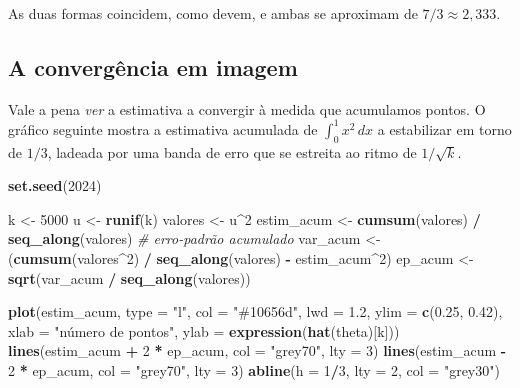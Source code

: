 \documentclass[
  portuguese,
  11pt,
  openany]{book}
\newenvironment{Shaded}{\begin{snugshade}}{\end{snugshade}}
\newcommand{\AttributeTok}[1]{\textcolor[rgb]{0.13,0.29,0.53}{#1}}
\newcommand{\CommentTok}[1]{\textcolor[rgb]{0.56,0.35,0.01}{\textit{#1}}}
\newcommand{\DecValTok}[1]{\textcolor[rgb]{0.00,0.00,0.81}{#1}}
\newcommand{\FloatTok}[1]{\textcolor[rgb]{0.00,0.00,0.81}{#1}}
\newcommand{\FunctionTok}[1]{\textcolor[rgb]{0.13,0.29,0.53}{\textbf{#1}}}
\newcommand{\NormalTok}[1]{#1}
\newcommand{\OtherTok}[1]{\textcolor[rgb]{0.56,0.35,0.01}{#1}}
\newcommand{\SpecialCharTok}[1]{\textcolor[rgb]{0.81,0.36,0.00}{\textbf{#1}}}
\newcommand{\StringTok}[1]{\textcolor[rgb]{0.31,0.60,0.02}{#1}}
\begin{document}
As duas formas coincidem, como devem, e ambas se aproximam de \(7/3 \approx 2{,}333\).

\subsection{A convergência em imagem}\label{a-converguxeancia-em-imagem}

Vale a pena \emph{ver} a estimativa a convergir à medida que acumulamos pontos. O
gráfico seguinte mostra a estimativa acumulada de \(\int_0^1 x^2\,dx\) a
estabilizar em torno de \(1/3\), ladeada por uma banda de erro que se estreita ao
ritmo de \(1/\sqrt{k}\).

\begin{Shaded}
\begin{Highlighting}[]
\FunctionTok{set.seed}\NormalTok{(}\DecValTok{2024}\NormalTok{)}

\NormalTok{k }\OtherTok{\textless{}{-}} \DecValTok{5000}
\NormalTok{u }\OtherTok{\textless{}{-}} \FunctionTok{runif}\NormalTok{(k)}
\NormalTok{valores }\OtherTok{\textless{}{-}}\NormalTok{ u}\SpecialCharTok{\^{}}\DecValTok{2}
\NormalTok{estim\_acum }\OtherTok{\textless{}{-}} \FunctionTok{cumsum}\NormalTok{(valores) }\SpecialCharTok{/} \FunctionTok{seq\_along}\NormalTok{(valores)}
\CommentTok{\# erro{-}padrão acumulado}
\NormalTok{var\_acum }\OtherTok{\textless{}{-}}\NormalTok{ (}\FunctionTok{cumsum}\NormalTok{(valores}\SpecialCharTok{\^{}}\DecValTok{2}\NormalTok{) }\SpecialCharTok{/} \FunctionTok{seq\_along}\NormalTok{(valores) }\SpecialCharTok{{-}}\NormalTok{ estim\_acum}\SpecialCharTok{\^{}}\DecValTok{2}\NormalTok{)}
\NormalTok{ep\_acum  }\OtherTok{\textless{}{-}} \FunctionTok{sqrt}\NormalTok{(var\_acum }\SpecialCharTok{/} \FunctionTok{seq\_along}\NormalTok{(valores))}

\FunctionTok{plot}\NormalTok{(estim\_acum, }\AttributeTok{type =} \StringTok{"l"}\NormalTok{, }\AttributeTok{col =} \StringTok{"\#10656d"}\NormalTok{, }\AttributeTok{lwd =} \FloatTok{1.2}\NormalTok{,}
     \AttributeTok{ylim =} \FunctionTok{c}\NormalTok{(}\FloatTok{0.25}\NormalTok{, }\FloatTok{0.42}\NormalTok{),}
     \AttributeTok{xlab =} \StringTok{"número de pontos"}\NormalTok{, }\AttributeTok{ylab =} \FunctionTok{expression}\NormalTok{(}\FunctionTok{hat}\NormalTok{(theta)[k]))}
\FunctionTok{lines}\NormalTok{(estim\_acum }\SpecialCharTok{+} \DecValTok{2} \SpecialCharTok{*}\NormalTok{ ep\_acum, }\AttributeTok{col =} \StringTok{"grey70"}\NormalTok{, }\AttributeTok{lty =} \DecValTok{3}\NormalTok{)}
\FunctionTok{lines}\NormalTok{(estim\_acum }\SpecialCharTok{{-}} \DecValTok{2} \SpecialCharTok{*}\NormalTok{ ep\_acum, }\AttributeTok{col =} \StringTok{"grey70"}\NormalTok{, }\AttributeTok{lty =} \DecValTok{3}\NormalTok{)}
\FunctionTok{abline}\NormalTok{(}\AttributeTok{h =} \DecValTok{1}\SpecialCharTok{/}\DecValTok{3}\NormalTok{, }\AttributeTok{lty =} \DecValTok{2}\NormalTok{, }\AttributeTok{col =} \StringTok{"grey30"}\NormalTok{)}
\end{Highlighting}
\end{Shaded}
\end{document}
